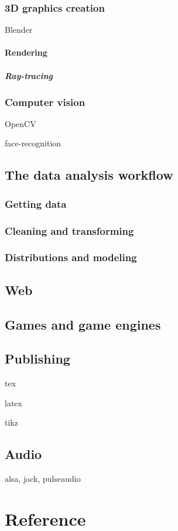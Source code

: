 \documentclass{report}
\begin{document}
\section{3D graphics creation}
Blender
\subsection{Rendering}
\subsubsection{Ray-tracing}
\section{Computer vision}
OpenCV

face-recognition

\chapter{The data analysis workflow}
\section{Getting data}
\section{Cleaning and transforming}
\section{Distributions and modeling}

\chapter{Web}
\chapter{Games and game engines}
\chapter{Publishing}
tex 

latex

tikz
\chapter{Audio}
alsa, jack, pulseaudio


\part{Reference}
\appendix
\end{document}
